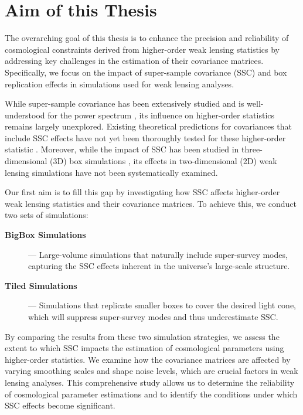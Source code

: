 \section{Aim of this Thesis}
The overarching goal of this thesis is to enhance the precision and reliability of cosmological constraints derived from higher-order weak lensing statistics by addressing key challenges in the estimation of their covariance matrices. Specifically, we focus on the impact of super-sample covariance (SSC) and box replication effects in simulations used for weak lensing analyses.

While super-sample covariance has been extensively studied and is well-understood for the power spectrum \citep{PhysRevD.87.123504, 2017JCAP...11..051B, 2018JCAP...06..015B}, its influence on higher-order statistics remains largely unexplored. Existing theoretical predictions for covariances that include SSC effects \citep{2023A&A...672A.185L, 2023OJAp....6E...1U} have not yet been thoroughly tested for these higher-order statistic \citep{2023A&A...675A.120E}. Moreover, while the impact of SSC has been studied in three-dimensional (3D) box simulations \citep{PhysRevD.108.043521}, its effects in two-dimensional (2D) weak lensing simulations have not been systematically examined.

Our first aim is to fill this gap by investigating how SSC affects higher-order weak lensing statistics and their covariance matrices. To achieve this, we conduct two sets of simulations:
\begin{description}
    \item[\textbf{BigBox Simulations}] --- Large-volume simulations that naturally include super-survey modes, capturing the SSC effects inherent in the universe's large-scale structure.
    \item[\textbf{Tiled Simulations}] --- Simulations that replicate smaller boxes to cover the desired light cone, which will suppress super-survey modes and thus underestimate SSC.
\end{description}
By comparing the results from these two simulation strategies, we assess the extent to which SSC impacts the estimation of cosmological parameters using higher-order statistics. We examine how the covariance matrices are affected by varying smoothing scales and shape noise levels, which are crucial factors in weak lensing analyses. This comprehensive study allows us to determine the reliability of cosmological parameter estimations and to identify the conditions under which SSC effects become significant.

